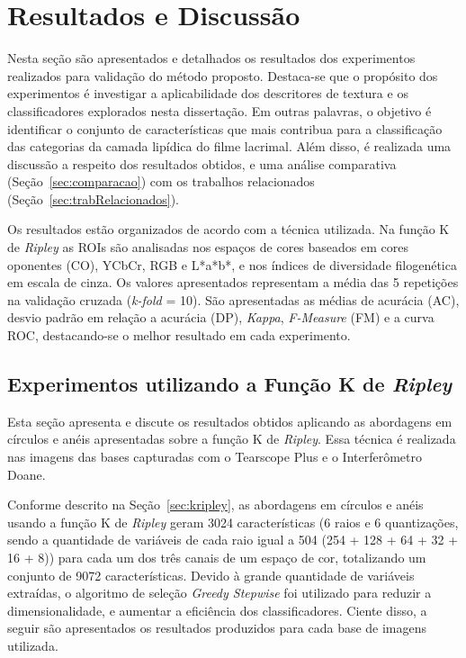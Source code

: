 \chapter{Resultados e Discussão}
\phantom{0}
\label{sec:resultadosDisc}

Nesta seção são apresentados e detalhados os resultados dos experimentos realizados para validação do método proposto. Destaca-se que o propósito dos experimentos é investigar a aplicabilidade dos descritores de textura e os classificadores explorados nesta dissertação. Em outras palavras, o objetivo é identificar o conjunto de características que mais contribua para a classificação das categorias da camada lipídica do filme lacrimal. Além disso, é realizada uma discussão a respeito dos resultados obtidos, e uma análise comparativa (Seção~\ref{sec:comparacao}) com os trabalhos relacionados (Seção~\ref{sec:trabRelacionados}).

Os resultados estão organizados de acordo com a técnica utilizada. Na função K de \textit{Ripley} as ROIs são analisadas nos espaços de cores baseados em cores oponentes (CO), YCbCr, RGB e L*a*b*, e nos índices de diversidade filogenética em escala de cinza. Os valores apresentados representam a média das 5 repetições na validação cruzada (\textit{k-fold} = 10). São apresentadas as médias de acurácia (AC), desvio padrão em relação a acurácia (DP), \textit{Kappa}, \textit{F-Measure} (FM) e a curva ROC, destacando-se o melhor resultado em cada experimento.


\section{Experimentos utilizando a Função K de \textit{Ripley}} 
\label{sec:expKRipley}

Esta seção apresenta e discute os resultados obtidos aplicando as abordagens em círculos e anéis apresentadas sobre a função K de \textit{Ripley}. Essa técnica é realizada nas imagens das bases capturadas com o Tearscope Plus e o Interferômetro Doane.

Conforme descrito na Seção~\ref{sec:kripley}, as abordagens em círculos e anéis usando a função K de \textit{Ripley} geram 3024 características (6 raios e 6 quantizações, sendo a quantidade de variáveis de cada raio igual a 504 (254 + 128 + 64 + 32 + 16 + 8)) para cada um dos três canais de um espaço de cor, totalizando um conjunto de 9072 características. Devido à grande quantidade de variáveis extraídas, o algoritmo de seleção \textit{Greedy Stepwise} foi utilizado para reduzir a dimensionalidade, e aumentar a eficiência dos classificadores. Ciente disso, a seguir são apresentados os resultados produzidos para cada base de imagens utilizada.

